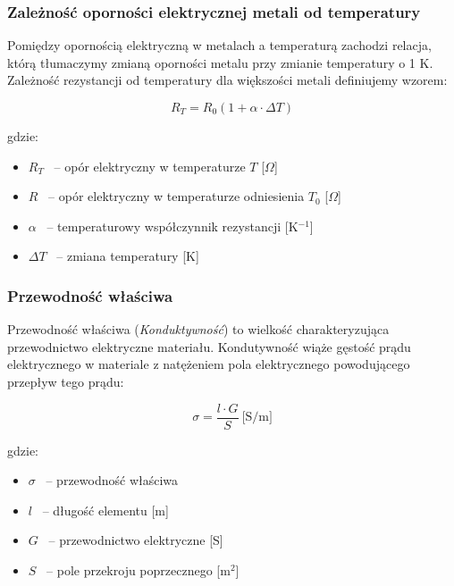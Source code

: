 \documentclass[a4paper,12pts]{article}
\begin{document}

	\subsubsection{Zależność oporności elektrycznej metali od temperatury}
	
	Pomiędzy opornością elektryczną w metalach a temperaturą zachodzi relacja, którą tłumaczymy zmianą oporności metalu przy zmianie temperatury o 1 K. Zależność rezystancji od temperatury dla większości metali definiujemy wzorem:
	
	\begin{equation}
		R_{T} = R_{0}(1 + \alpha \cdot \Delta T)
	\end{equation}
	
	\newpage
	gdzie:
	\begin{itemize}
	\item $R_{T}$ ~-- opór elektryczny w temperaturze $T$ [$\Omega$]
	\item $R$ ~-- opór elektryczny w temperaturze odniesienia $T_{0}$ [$\Omega$]
	\item $\alpha$ ~-- temperaturowy współczynnik rezystancji [K$^{-1}$]
	\item $\Delta T$ ~-- zmiana temperatury [K]
\end{itemize}
	

	\subsubsection{Przewodność właściwa}
	
	Przewodność właściwa (\textit{Konduktywność}) to wielkość charakteryzująca przewodnictwo elektryczne materiału. Kondutywność wiąże gęstość prądu elektrycznego w materiale z natężeniem pola elektrycznego powodującego przepływ tego prądu: 
	
	\begin{equation}
		\sigma = \frac{l \cdot G}{S} ~\textrm{[S/m]}
	\end{equation}
	
	gdzie:
	\begin{itemize}
		\item $\sigma$ ~-- przewodność właściwa 
		\item $l$ ~-- długość elementu [m]
		\item $G$ ~-- przewodnictwo elektryczne [S]
		\item $S$ ~-- pole przekroju poprzecznego [m$^{2}$]
	\end{itemize}
\end{document}
